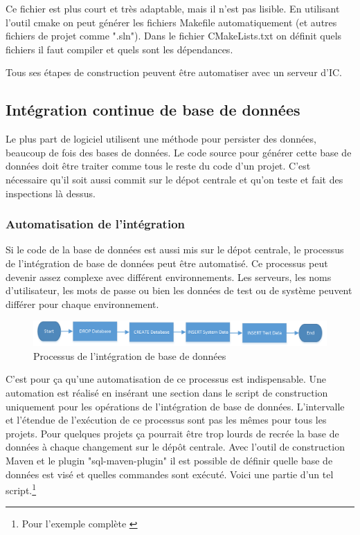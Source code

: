 Ce fichier est plus court et très adaptable, mais il n'est pas lisible.
En utilisant l'outil cmake on peut générer les fichiers Makefile automatiquement (et autres fichiers de projet comme ".sln").
Dans le fichier CMakeLists.txt on définit quels fichiers il faut compiler et quels sont les dépendances.


Tous ses étapes de construction peuvent être automatiser avec un serveur d'IC.
\newpage

\subsection{Intégration continue de base de données}

Le plus part de logiciel utilisent une méthode pour persister des données, beaucoup de fois des bases de données. Le code source pour générer cette base de données doit être traiter comme tous le reste du code d'un projet. C'est nécessaire qu'il soit aussi commit sur le dépot centrale et qu'on teste et fait des inspections là dessus.

\subsubsection{Automatisation de l'intégration}
Si le code de la base de données est aussi mis sur le dépot centrale, le processus de l'intégration de base de données peut être automatisé. Ce processus peut devenir assez complexe avec différent environnements. Les serveurs, les noms d'utilisateur, les mots de passe ou bien les données de test ou de système peuvent différer pour chaque environnement.
\begin{figure}[H]
	\centering
		\includegraphics[scale=1]{bilder/database_integration}
	\caption{Processus de l'intégration de base de données}
	\label{fig:processus}
\end{figure}

C'est pour ça qu'une automatisation de ce processus est indispensable. Une automation est réalisé en insérant une section dans le script de construction uniquement pour les opérations de l'intégration de base de données. L'intervalle et l'étendue de l'exécution de ce processus sont pas les mêmes pour tous les projets. Pour quelques projets ça pourrait être trop lourds de recrée la base de données à chaque changement sur le dépôt centrale. Avec l'outil de construction Maven et le plugin "sql-maven-plugin" il est possible de définir quelle base de données est visé et quelles commandes sont exécuté. Voici une partie d'un tel script.\footnote{Pour l'exemple complète \cite{mvnsql}}

